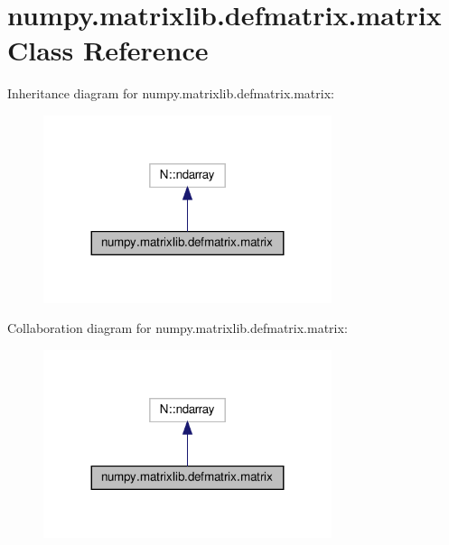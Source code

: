 \hypertarget{classnumpy_1_1matrixlib_1_1defmatrix_1_1matrix}{}\section{numpy.\+matrixlib.\+defmatrix.\+matrix Class Reference}
\label{classnumpy_1_1matrixlib_1_1defmatrix_1_1matrix}


Inheritance diagram for numpy.\+matrixlib.\+defmatrix.\+matrix\+:
\nopagebreak
\begin{figure}[H]
\begin{center}
\leavevmode
\includegraphics[width=239pt]{classnumpy_1_1matrixlib_1_1defmatrix_1_1matrix__inherit__graph}
\end{center}
\end{figure}


Collaboration diagram for numpy.\+matrixlib.\+defmatrix.\+matrix\+:
\nopagebreak
\begin{figure}[H]
\begin{center}
\leavevmode
\includegraphics[width=239pt]{classnumpy_1_1matrixlib_1_1defmatrix_1_1matrix__coll__graph}
\end{center}
\end{figure}

